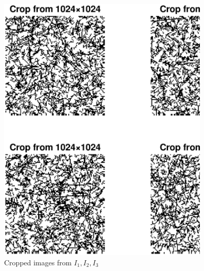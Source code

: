 \documentclass[11pt, oneside]{article}   	%
\begin{document}
\begin{figure}[H]
	\centering
	\includegraphics[width=0.9\textwidth]{prob3}
	\caption{Cropped images from $I_1, I_2, I_3$}
	\label {fig:prob3}
\end{figure}
\end{document}
